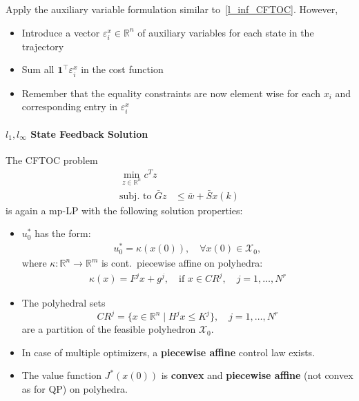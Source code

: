 \newpar{}

Apply the auxiliary variable formulation similar to~\ref{l_inf_CFTOC}. However,
\begin{itemize}
    \item Introduce a vector $\varepsilon_i^x \in \mathbb{R}^n$ of auxiliary variables for each state in the trajectory
    \item Sum all $\mathbf{1}^\top \varepsilon_i^x$ in the cost function
    \item Remember that the equality constraints are now element wise for each $x_i$ and corresponding entry in $\varepsilon_i^x$
\end{itemize}

\paragraph[l1, linf State Feedback Solution]{$l_{1}, l_{\infty}$ State Feedback Solution}

The CFTOC problem
\begin{align*}
    \min_{z\in\mathbb{R}^n}c^T z                            \\
    \text{subj.\ to } \bar{G}z & \leq \bar{w} + \bar{S}x(k)
\end{align*}
is again a mp-LP with the following solution properties:
\begin{itemize}
    \item $u_0^*$ has the form:
          \begin{align*}
              u_0^* = \kappa(x(0)), \quad \forall x(0) \in \mathcal{X}_0,
          \end{align*}
          where $\kappa : \mathbb{R}^n \to \mathbb{R}^m$ is cont.\, piecewise affine on polyhedra:
          \begin{align*}
              \kappa(x) = F^j x + g^j, \quad \text{if } x \in CR^j, \quad j = 1, \dots, N^r
          \end{align*}
    \item The polyhedral sets
          \begin{equation*}
              CR^j = \{x \in \mathbb{R}^n \mid H^j x \leq K^j\}, \quad j = 1, \dots, N^r
          \end{equation*}
          are a partition of the feasible polyhedron $\mathcal{X}_0$.
    \item In case of multiple optimizers, a \textbf{piecewise affine} control law exists.
    \item The value function $J^*(x(0))$ is \textbf{convex} and \textbf{piecewise affine} (not convex as for QP) on polyhedra.
\end{itemize}

